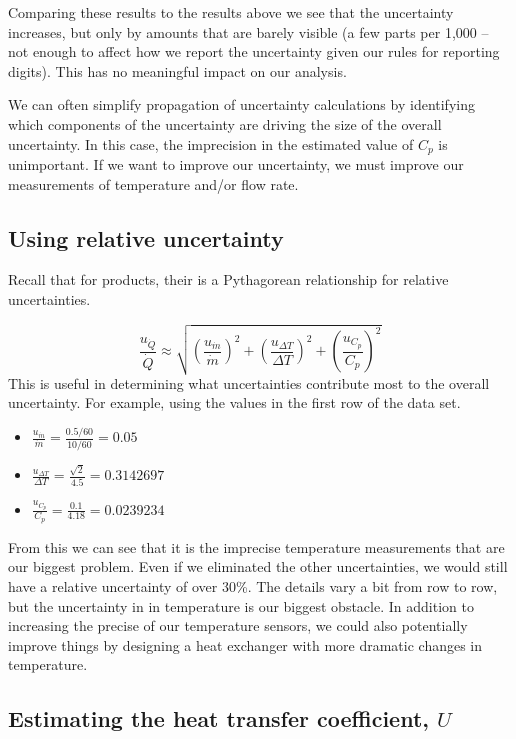 \documentclass[twoside]{book}\usepackage[]{graphicx}\usepackage[]{xcolor}
\newcounter{example}[section]
\begin{document}
Comparing these results to the results above we see that the uncertainty
increases, but only by amounts that are barely visible (a few parts per
1,000 -- not enough to affect how we report the uncertainty given our rules
for reporting digits).  This has no meaningful impact on our analysis.

We can often simplify propagation of uncertainty calculations by identifying which 
components of the uncertainty are driving the size of the overall uncertainty.  In this case, 
the imprecision in the estimated value of $C_p$ is unimportant.  If we want to improve our
uncertainty, we must improve our measurements of temperature and/or flow rate.

\subsection{Using relative uncertainty}

Recall that for products, their is a Pythagorean relationship for relative uncertainties.

\[
\frac{u_{\dot Q}}{\dot Q} \approx 
\sqrt{ 
(\frac{u_{\dot m}}{\dot{m}})^2
+
(\frac{u_{\Delta T}}{\Delta T})^2
+
(\frac{u_{C_p}}{C_p})^2
}
\]
This is useful in determining what uncertainties contribute most to the overall uncertainty.
For example, using the values in the first row of the data set.
\begin{itemize}
	\item
		$\displaystyle \frac{u_{\dot{m}}}{\dot{m}} = \frac{0.5/60}{10/60} = 0.05$
	\item
		$\displaystyle \frac{u_{\Delta T}}{\Delta T} = \frac{\sqrt{2}}{4.5} = 0.3142697$
	\item
		$\displaystyle \frac{u_{C_p}}{C_p} = \frac{0.1}{4.18} = 0.0239234$
\end{itemize}
From this we can see that it is the imprecise temperature measurements that are our biggest
problem.  Even if we eliminated the other uncertainties, we would still have a relative uncertainty
of over $30$\%.   The details vary a bit from row to row, but the uncertainty in in temperature 
is our biggest obstacle.  In addition to increasing the precise of our temperature sensors, we could 
also potentially improve things by designing a heat exchanger with more dramatic changes in 
temperature.


\subsection{Estimating the heat transfer coefficient, $U$}
\end{document}
